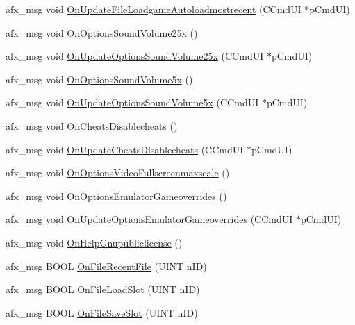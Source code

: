 \begin{DoxyCompactItemize}
\item 
afx\+\_\+msg void \mbox{\hyperlink{class_main_wnd_abe122b4b5d794d792cdf65a4c066d43d}{On\+Update\+File\+Loadgame\+Autoloadmostrecent}} (C\+Cmd\+UI $\ast$p\+Cmd\+UI)
\item 
afx\+\_\+msg void \mbox{\hyperlink{class_main_wnd_a023f468053008a509a35b2a08a7661ee}{On\+Options\+Sound\+Volume25x}} ()
\item 
afx\+\_\+msg void \mbox{\hyperlink{class_main_wnd_a87b6c7456e128d8d0740c7265a080285}{On\+Update\+Options\+Sound\+Volume25x}} (C\+Cmd\+UI $\ast$p\+Cmd\+UI)
\item 
afx\+\_\+msg void \mbox{\hyperlink{class_main_wnd_a1f06aa4d5d0a115db396574ec2fc7f02}{On\+Options\+Sound\+Volume5x}} ()
\item 
afx\+\_\+msg void \mbox{\hyperlink{class_main_wnd_ae343c11545af1642af98dfa03584e114}{On\+Update\+Options\+Sound\+Volume5x}} (C\+Cmd\+UI $\ast$p\+Cmd\+UI)
\item 
afx\+\_\+msg void \mbox{\hyperlink{class_main_wnd_a0bd860492fa9bd1b58a3baf46bda6cad}{On\+Cheats\+Disablecheats}} ()
\item 
afx\+\_\+msg void \mbox{\hyperlink{class_main_wnd_a7eae676f3ed65c790243e6a051c554c0}{On\+Update\+Cheats\+Disablecheats}} (C\+Cmd\+UI $\ast$p\+Cmd\+UI)
\item 
afx\+\_\+msg void \mbox{\hyperlink{class_main_wnd_a31678f98dfdc982e2f4e242293fc85e0}{On\+Options\+Video\+Fullscreenmaxscale}} ()
\item 
afx\+\_\+msg void \mbox{\hyperlink{class_main_wnd_a219c1f71e6f873fc5f48d19fe6ce36ac}{On\+Options\+Emulator\+Gameoverrides}} ()
\item 
afx\+\_\+msg void \mbox{\hyperlink{class_main_wnd_ae8b5a29533bf12488647e91737a775c0}{On\+Update\+Options\+Emulator\+Gameoverrides}} (C\+Cmd\+UI $\ast$p\+Cmd\+UI)
\item 
afx\+\_\+msg void \mbox{\hyperlink{class_main_wnd_ac0666597df52e2525a34d65f9795db75}{On\+Help\+Gnupubliclicense}} ()
\item 
afx\+\_\+msg B\+O\+OL \mbox{\hyperlink{class_main_wnd_a0d7f7d468e486be90f1b6771bff84846}{On\+File\+Recent\+File}} (U\+I\+NT n\+ID)
\item 
afx\+\_\+msg B\+O\+OL \mbox{\hyperlink{class_main_wnd_a84c4154350bd26b393fcd82948d342e1}{On\+File\+Load\+Slot}} (U\+I\+NT n\+ID)
\item 
afx\+\_\+msg B\+O\+OL \mbox{\hyperlink{class_main_wnd_aa10e0e321035d0cd1e1e953529df5f19}{On\+File\+Save\+Slot}} (U\+I\+NT n\+ID)
\end{DoxyCompactItemize}


